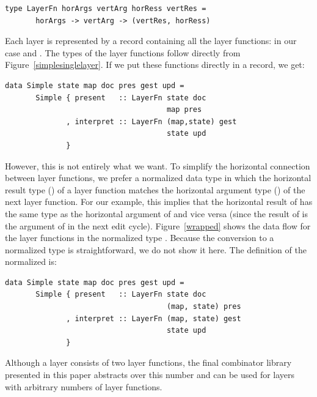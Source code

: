 \documentclass[preprint,natbib]{sigplanconf}
\begin{document}
\begin{small}
\begin{verbatim}
type LayerFn horArgs vertArg horRess vertRes =
       horArgs -> vertArg -> (vertRes, horRess)
\end{verbatim}
\end{small}



Each layer is represented by a record containing all the layer functions: in our case  and . The types of the layer functions follow directly from Figure~\ref{simplesinglelayer}.  If we  put these functions directly in a record, we  get:

\begin{small}
\begin{verbatim}
data Simple state map doc pres gest upd =
       Simple { present   :: LayerFn state doc 
                                     map pres
              , interpret :: LayerFn (map,state) gest
                                     state upd
              }
\end{verbatim}
\end{small}


However, this is not entirely what we want. To simplify the horizontal connection between layer functions, we prefer a normalized data type in which the horizontal result type () of a layer function matches the horizontal argument type () of the next layer function. For our example, this implies that the horizontal result of  has the same type as the horizontal argument of  and vice versa (since the result of  is the argument of  in the next edit cycle). Figure~\ref{wrapped} shows the data flow for the layer functions in the normalized type . Because the conversion to a normalized type is straightforward, we do not show it here. The definition of the normalized  is:

\begin{small}
\begin{verbatim}
data Simple state map doc pres gest upd =
       Simple { present   :: LayerFn state doc 
                                     (map, state) pres
              , interpret :: LayerFn (map, state) gest
                                     state upd
              }
\end{verbatim}
\end{small}

Although a  layer consists of two layer functions, the final combinator library presented in this paper abstracts over this number and can be used for layers with arbitrary numbers of layer functions.
\end{document}
